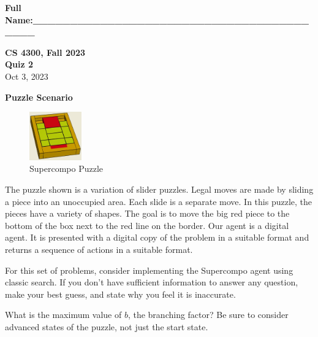 \documentclass[11pt]{article}
\begin{document}
\begin{flushright}
{\large\bf Full Name:\_\_\_\_\_\_\_\_\_\_\_\_\_\_\_\_\_\_\_\_\_\_\_\_\_\_\_\_\_\_\_\_\_\_\_\_\_\_\_\_\_ } \\[1ex]
\end{flushright}
\vspace*{0.5 in}

\setcounter{maxpage}{3}

\begin{center}
{\LARGE\bf CS 4300, Fall 2023\\ [2 ex]
Quiz 2}\\ [2 ex]
Oct 3, 2023
\end{center}

\textbf{Puzzle Scenario}

\begin{figure}
  \vspace{-22pt}
  \begin{center}
    \includegraphics[width=0.20\textwidth]{jk-supercompo.jpg}
  \end{center}
  \vspace{-20pt}
  \caption{Supercompo Puzzle}
\end{figure}

The puzzle shown is a variation of slider puzzles.  Legal moves are made
by sliding a piece into an unoccupied area.  Each slide is a separate
move.  In this puzzle, the pieces have a variety of shapes.  The goal
is to move the big red piece to the bottom of the box next to the
red line on the border.  Our agent is a digital agent.  It is presented with
a digital copy of the problem in a suitable format and returns a sequence
of actions in a suitable format.

For this set of problems, consider implementing the Supercompo agent using classic search.
If you don't have sufficient information to answer any question, make your
best guess, and state why you feel it is inaccurate.

\begin{problem}{1}
  What is the maximum value of $b$, the branching factor?  Be sure to consider
  advanced states of the puzzle, not just the start state.
  \vspace*{1.5in}
\end{problem}
\end{document}
